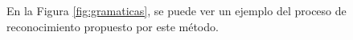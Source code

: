 En la Figura \ref{fig:gramaticas}, se puede ver un ejemplo del proceso de reconocimiento propuesto por este método.

\begin{figure}[h]
    \centering

\end{figure}

